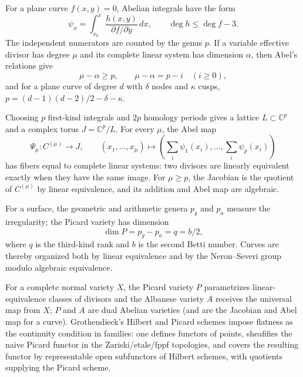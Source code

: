 \documentclass[11pt]{report}
\begin{document}
\begin{remark}
\label{kps-intro-abelian-integrals}
For a plane curve $f(x,y)=0$, Abelian integrals have the form
\[
  \psi_x=\int_{x_0}^x \frac{h(x,y)}{\partial f/\partial y}\,dx,
  \qquad \deg h\leq \deg f-3.
\]
The independent numerators are counted by the genus $p$. If a variable
effective divisor has degree $\mu$ and its complete linear system has
dimension $\alpha$, then Abel's relations give
\[
  \mu-\alpha\geq p,\qquad \mu-\alpha=p-i\quad(i\geq 0),
\]
and for a plane curve of degree $d$ with $\delta$ nodes and $\kappa$ cusps,
$p=(d-1)(d-2)/2-\delta-\kappa$.
\end{remark}

\begin{remark}
\label{kps-intro-jacobian}
Choosing $p$ first-kind integrals and $2p$ homology periods gives a lattice
$L\subset\mathbb C^p$ and a complex torus $J=\mathbb C^p/L$. For every
$\mu$, the Abel map
\[
  \Psi_\mu:C^{(\mu)}\longrightarrow J,
  \qquad (x_1,\ldots,x_\mu)\longmapsto
  \left(\sum_i\psi_1(x_i),\ldots,\sum_i\psi_p(x_i)\right)
\]
has fibers equal to complete linear systems: two divisors are linearly
equivalent exactly when they have the same image. For $\mu\geq p$, the
Jacobian is the quotient of $C^{(\mu)}$ by linear equivalence, and its
addition and Abel map are algebraic.
\end{remark}

\begin{remark}
\label{kps-intro-surface-invariants}
For a surface, the geometric and arithmetic genera $p_g$ and $p_a$ measure
the irregularity; the Picard variety has dimension
\[
  \dim P=p_g-p_a=q=b/2,
\]
where $q$ is the third-kind rank and $b$ is the second Betti number. Curves
are thereby organized both by linear equivalence and by the
Neron--Severi group modulo algebraic equivalence.
\end{remark}

\begin{remark}
\label{kps-intro-picard-construction}
For a complete normal variety $X$, the Picard variety $P$ parametrizes
linear-equivalence classes of divisors and the Albanese variety $A$ receives
the universal map from $X$; $P$ and $A$ are dual Abelian varieties (and are
the Jacobian and Abel map for a curve). Grothendieck's Hilbert and Picard
schemes impose flatness as the continuity condition in families: one defines
functors of points, sheafifies the naive Picard functor in the
Zariski/etale/fppf topologies, and covers the resulting functor by
representable open subfunctors of Hilbert schemes, with quotients supplying
the Picard scheme.
\end{remark}
\end{document}
